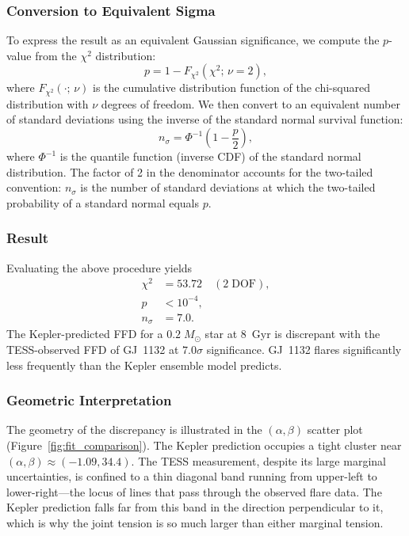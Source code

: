 \subsubsection{Conversion to Equivalent Sigma}

To express the result as an equivalent Gaussian significance, we
compute the $p$-value from the $\chi^2$ distribution:
\begin{equation}
p = 1 - F_{\chi^2}(\chi^2;\, \nu = 2),
\label{eq:pvalue}
\end{equation}
where $F_{\chi^2}(\cdot;\, \nu)$ is the cumulative distribution
function of the chi-squared distribution with $\nu$ degrees of
freedom.  We then convert to an equivalent number of standard
deviations using the inverse of the standard normal survival function:
\begin{equation}
n_\sigma = \Phi^{-1}\!\left(1 - \frac{p}{2}\right),
\label{eq:nsigma}
\end{equation}
where $\Phi^{-1}$ is the quantile function (inverse CDF) of the
standard normal distribution.  The factor of 2 in the denominator
accounts for the two-tailed convention: $n_\sigma$ is the number of
standard deviations at which the two-tailed probability of a standard
normal equals $p$.

\subsubsection{Result}

Evaluating the above procedure yields
\begin{align}
\chi^2 &= 53.72 \quad (2\;\mathrm{DOF}), \\
p &< 10^{-4}, \\
n_\sigma &= 7.0.
\end{align}
The Kepler-predicted FFD for a $0.2\;M_\odot$ star at 8~Gyr is
discrepant with the TESS-observed FFD of GJ~1132 at $7.0\sigma$
significance.  GJ~1132 flares significantly less frequently than the
Kepler ensemble model predicts.

\subsubsection{Geometric Interpretation}

The geometry of the discrepancy is illustrated in the $(\alpha,
\beta)$ scatter plot (Figure~\ref{fig:fit_comparison}).  The Kepler
prediction occupies a tight cluster near $(\alpha, \beta) \approx
(-1.09, 34.4)$.  The TESS measurement, despite its large marginal
uncertainties, is confined to a thin diagonal band running from
upper-left to lower-right---the locus of lines that pass through the
observed flare data.  The Kepler prediction falls far from this band
in the direction perpendicular to it, which is why the joint tension
is so much larger than either marginal tension.

